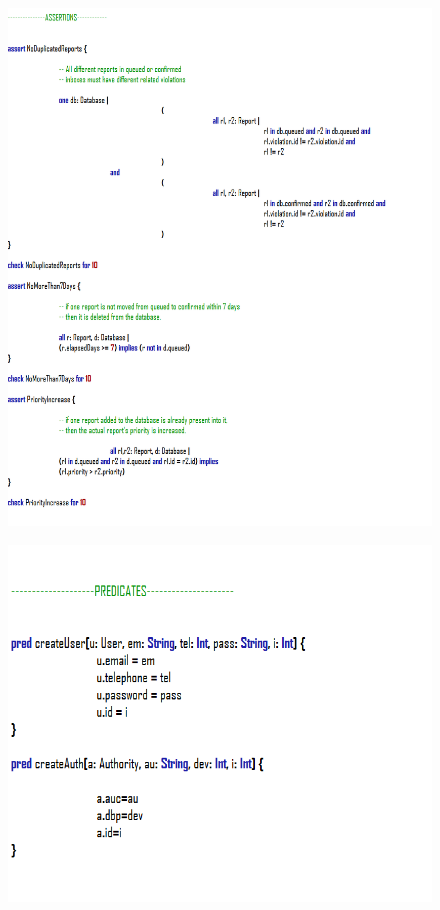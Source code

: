 \documentclass[12pt,a4paper]{article}
\begin{document}
			\begin{figure}[H]
				\centering
				\includegraphics[width=1\linewidth]{images/exports/user/Assertions.png}
				\label{fig:assertions}
			\end{figure}
			\begin{figure}[H]
				\centering
				\includegraphics[width=1.2\linewidth]{images/exports/user/Predicates.png}
				\label{fig:predicates}
			\end{figure}
\end{document}
